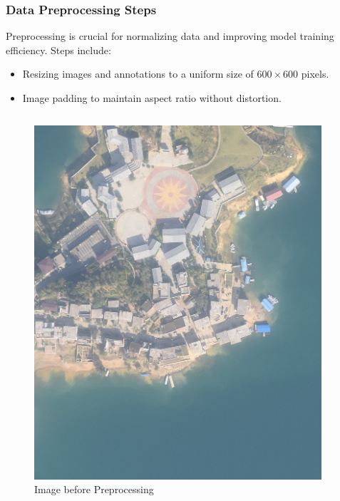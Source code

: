 \documentclass{beamer}
\begin{document}
\begin{frame}[t]
  \frametitle{Data Preprocessing Steps}
  Preprocessing is crucial for normalizing data and improving model training efficiency. Steps include:
  \begin{itemize}
    \item Resizing images and annotations to a uniform size of \(600 \times 600\) pixels.
    \item Image padding to maintain aspect ratio without distortion.
  \end{itemize}

  \begin{columns}
    \begin{column}{0.5\textwidth}
    \centering
    \begin{figure}
      \includegraphics[scale=0.07]{Figures/uav_example.jpg}
      \caption{Image before Preprocessing}
      \label{fig:pre-process}
    \end{figure}
  \end{column}
  \begin{column}{0.5\textwidth}
    \centering

\end{column}
\end{columns}
\end{frame}
\end{document}
